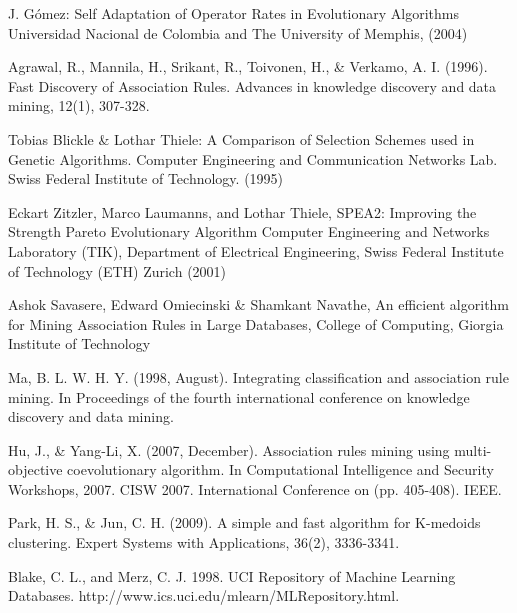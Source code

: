 \documentclass{llncs}
\begin{document}
\begin{thebibliography}{5}
%

J. Gómez:
Self Adaptation of Operator Rates in Evolutionary Algorithms
Universidad Nacional de Colombia and The University of Memphis, (2004)

Agrawal, R., Mannila, H., Srikant, R., Toivonen, H., \& Verkamo, A. I. (1996). Fast Discovery of Association Rules. Advances in knowledge discovery and data mining, 12(1), 307-328.

Tobias Blickle \& Lothar Thiele:
A Comparison of Selection Schemes used in Genetic Algorithms.
Computer Engineering and Communication Networks Lab.
Swiss Federal Institute of Technology. (1995)

Eckart Zitzler, Marco Laumanns, and Lothar Thiele,
SPEA2: Improving the Strength Pareto Evolutionary Algorithm
Computer Engineering and Networks Laboratory (TIK),
Department of Electrical Engineering,
Swiss Federal Institute of Technology (ETH) Zurich (2001)

Ashok Savasere, Edward Omiecinski \& Shamkant Navathe,
An efficient algorithm for Mining Association Rules in Large Databases,
College of Computing,
Giorgia Institute of Technology

Ma, B. L. W. H. Y. (1998, August). Integrating classification and association rule mining. In Proceedings of the fourth international conference on knowledge discovery and data mining.

Hu, J., \& Yang-Li, X. (2007, December). Association rules mining using multi-objective coevolutionary algorithm. In Computational Intelligence and Security Workshops, 2007. CISW 2007. International Conference on (pp. 405-408). IEEE.

Park, H. S., \& Jun, C. H. (2009). A simple and fast algorithm for K-medoids clustering. Expert Systems with Applications, 36(2), 3336-3341.

Blake, C. L., and Merz, C. J. 1998. UCI
Repository of Machine Learning Databases.
http://www.ics.uci.edu/mlearn/MLRepository.html.
\end{thebibliography}
\end{document}
